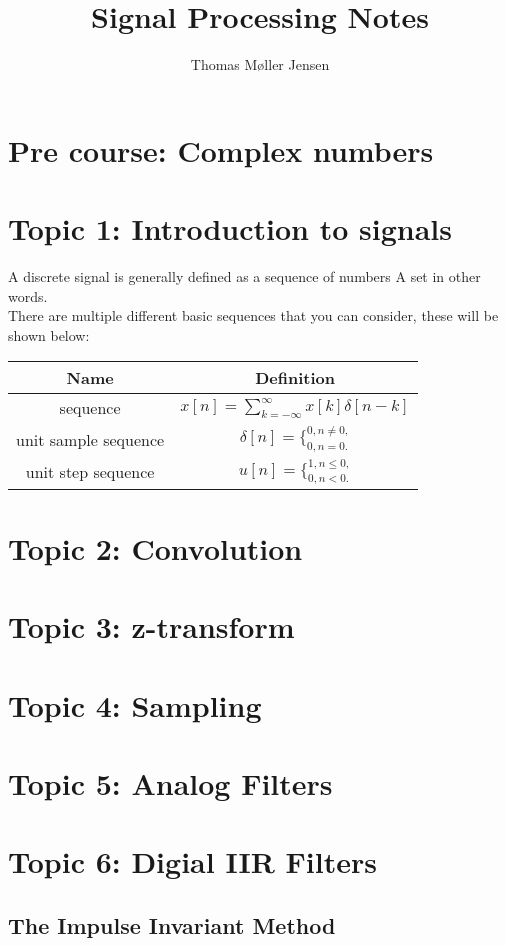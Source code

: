 \documentclass{article}
\title{Signal Processing Notes}
\author{Thomas Møller Jensen}
\begin{document}
\maketitle
\section*{Pre course: Complex numbers}
\section*{Topic 1: Introduction to signals}
A discrete signal is generally defined as a sequence of numbers \- A set in other words.\\
There are multiple different basic sequences that you can consider, these will be shown below:
\begin{table}[H]
	\centering
	\begin{tabular}{|c|c|}
		\hline
		\textbf{Name} & \textbf{Definition} \\\hline
		sequence & $x[n]=\sum_{k=-\infty}^{\infty} x[k]\delta [n-k]$ \\\hline
		unit sample sequence & $\delta [n]=\{^{0, n\neq 0,}_{0, n = 0.}$ \\\hline
		unit step sequence & $u[n]=\{^{1, n \leq 0,}_{0, n<0.}$ \\\hline
	\end{tabular}
	
\end{table}

\section*{Topic 2: Convolution}
\section*{Topic 3: z-transform}
\section*{Topic 4: Sampling}
\section*{Topic 5: Analog Filters}
\section*{Topic 6: Digial IIR Filters}
\subsection*{The Impulse Invariant Method}
\end{document}
